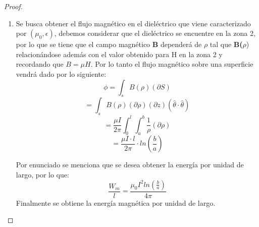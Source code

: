 \begin{proof}
\begin{enumerate}
        \item Se busca obtener el flujo magnético en el dieléctrico que viene caracterizado por $(\mu_{0},\epsilon)$, debemos considerar que el dieléctrico se encuentre en la zona 2, por lo que se tiene que el campo magnético \textbf{B} dependerá de $\rho$ tal que \textbf{B($\rho$}) relacionándose además con el valor obtenido para H en la zona 2 y recordando que $B = \mu H$. Por lo tanto el flujo magnético sobre una superficie vendrá dado por lo siguiente:
        \begin{equation}
            \phi = \int_{s} B(\rho)  (\partial S)
        \end{equation}
        \begin{equation}
                 = \int_{s} B(\rho) (\partial\rho)( \partial z) (\hat{\theta} \cdot \hat{\theta})
        \end{equation}
        \begin{equation}
                 = \frac{\mu I}{2\pi} \int_{0}^{l} \int_{a}^{b} \frac{1}{\rho} (\partial \rho)
        \end{equation}
        \begin{equation}
                 = \frac{\mu I \cdot l}{2\pi}\cdot ln\left(\frac{b}{a}\right)
        \end{equation}
        
        Por enunciado se menciona que se desea obtener la energía por unidad de largo, por lo que: 
        \begin{equation}
            \frac{W_{m}}{l}= \frac{\mu_{0} I^{2} ln(\frac{b}{a})}{4 \pi}
        \end{equation}
        Finalmente se obtiene la energía magnética por unidad de largo.
    \end{enumerate}
\end{proof}
\newpage

